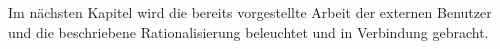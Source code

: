 Im nächsten Kapitel wird die bereits vorgestellte Arbeit der externen Benutzer und die beschriebene Rationalisierung beleuchtet und in Verbindung gebracht. 







